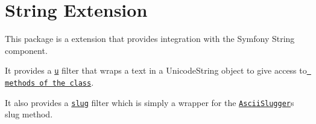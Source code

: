 \chapter{String Extension}
\hypertarget{md_public_2glpi_2vendor_2twig_2string-extra_2_r_e_a_d_m_e}{}\label{md_public_2glpi_2vendor_2twig_2string-extra_2_r_e_a_d_m_e}
This package is a  extension that provides integration with the Symfony String component.

It provides a \href{https://twig.symfony.com/u}{\texttt{ {\ttfamily u}}} filter that wraps a text in a {\ttfamily Unicode\+String} object to give access to \href{https://symfony.com/doc/current/components/string.html}{\texttt{ methods of the class}}.

It also provides a \href{https://twig.symfony.com/slug}{\texttt{ {\ttfamily slug}}} filter which is simply a wrapper for the \href{https://symfony.com/doc/current/components/string.html\#slugger}{\texttt{ {\ttfamily Ascii\+Slugger}}}\textquotesingle{}s {\ttfamily slug} method. 